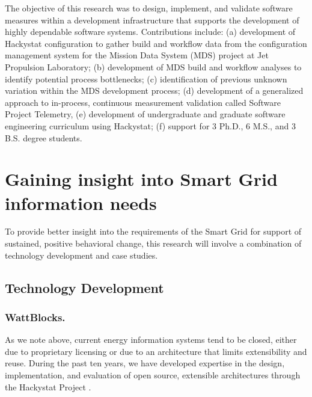 The objective of this research was to design, implement, and validate
software measures within a development infrastructure that supports the
development of highly dependable software systems.  Contributions include:
(a) development of Hackystat configuration to gather build and workflow
data from the configuration management system for the Mission Data System
(MDS) project at Jet Propulsion Laboratory; (b) development of MDS build
and workflow analyses to identify potential process bottlenecks; (c)
identification of previous unknown variation within the MDS development
process; (d) development of a generalized approach to in-process,
continuous measurement validation called Software Project Telemetry, (e)
development of undergraduate and graduate software engineering curriculum
using Hackystat; (f) support for 3 Ph.D., 6 M.S., and 3 B.S. degree
students.

\section{Gaining insight into Smart Grid information needs}
\label{sec:methodology}

To provide better insight into the requirements of the Smart Grid for
support of sustained, positive behavioral change, this research will
involve a combination of  technology development and case studies.

\subsection{Technology Development}

\subsubsection{WattBlocks.}

As we note above, current energy information systems tend to be closed,
either due to proprietary licensing or due to an architecture that limits
extensibility and reuse.  During the past ten years, we have developed
expertise in the design, implementation, and evaluation of open source,
extensible architectures through the Hackystat Project
\cite{csdl2-06-06,csdl2-09-02,csdl2-09-07,csdl2-09-01}.

